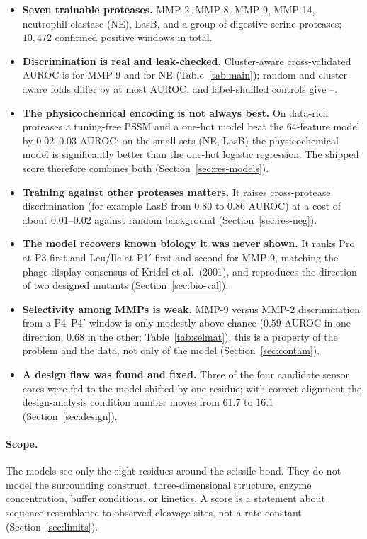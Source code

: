 \begin{keybox}
\begin{itemize}
\item \textbf{Seven trainable proteases.} MMP-2, MMP-8, MMP-9, MMP-14, neutrophil elastase (NE), LasB, and a group of digestive serine proteases; $10{,}472$ confirmed positive windows in total.
\item \textbf{Discrimination is real and leak-checked.} Cluster-aware cross-validated AUROC is \aucConsMMPnine{} for MMP-9 and \aucConsNE{} for NE (Table~\ref{tab:main}); random and cluster-aware folds differ by at most \maxLeakGap{} AUROC, and label-shuffled controls give \shuffleMin--\shuffleMax{}.
\item \textbf{The physicochemical encoding is not always best.} On data-rich proteases a tuning-free PSSM and a one-hot model beat the $64$-feature model by $0.02$--$0.03$ AUROC; on the small sets (NE, LasB) the physicochemical model is significantly better than the one-hot logistic regression. The shipped score therefore combines both (Section~\ref{sec:res-models}).
\item \textbf{Training against other proteases matters.} It raises cross-protease discrimination (for example LasB from $0.80$ to $0.86$ AUROC) at a cost of about $0.01$--$0.02$ against random background (Section~\ref{sec:res-neg}).
\item \textbf{The model recovers known biology it was never shown.} It ranks Pro at P3 first and Leu/Ile at P1$'$ first and second for MMP-9, matching the phage-display consensus of Kridel et al.\ (2001), and reproduces the direction of two designed mutants (Section~\ref{sec:bio-val}).
\item \textbf{Selectivity among MMPs is weak.} MMP-9 versus MMP-2 discrimination from a P4--P4$'$ window is only modestly above chance ($0.59$ AUROC in one direction, $0.68$ in the other; Table~\ref{tab:selmat}); this is a property of the problem and the data, not only of the model (Section~\ref{sec:contam}).
\item \textbf{A design flaw was found and fixed.} Three of the four candidate sensor cores were fed to the model shifted by one residue; with correct alignment the design-analysis condition number moves from $61.7$ to $16.1$ (Section~\ref{sec:design}).
\end{itemize}
\end{keybox}

\paragraph{Scope.} The models see only the eight residues around the scissile bond. They do not model the surrounding construct, three-dimensional structure, enzyme concentration, buffer conditions, or kinetics. A score is a statement about sequence resemblance to observed cleavage sites, not a rate constant (Section~\ref{sec:limits}).
